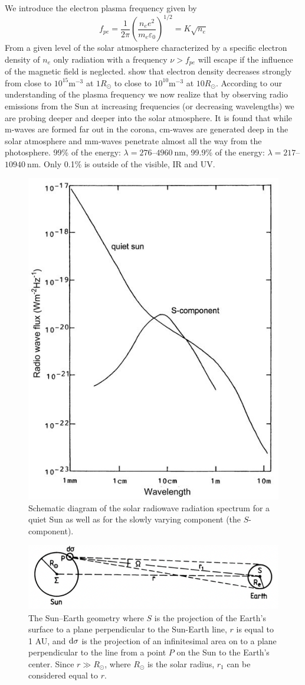We introduce the electron plasma frequency given by
\begin{equation*}
    f_{pe}=\frac{1}{2\pi}{\left(\frac{n_{e}e^2}{m_{e}\varepsilon_0}\right)}^{1/2}=K\sqrt{n_e}
\end{equation*}
From a given level of the solar atmosphere characterized by a specific electron density of \(n_e\) only radiation with a frequency \(\nu >f_{pe}\) will escape if the influence of the magnetic field is neglected.  show that electron density decreases strongly from close to \(10^{15} \si{\metre^{-3}}\) at \(1R_\odot \) to close to \(10^{10} \si{\metre^{-3}}\) at \(10R_\odot \). According to our understanding of the plasma frequency we now realize that by observing radio emissions from the Sun at increasing frequencies (or decreasing wavelengths) we are probing deeper and deeper into the solar atmosphere. It is found that while m-waves are formed far out in the corona, cm-waves are generated deep in the solar atmosphere and mm-waves penetrate almost all the way from the photosphere. 99\% of the energy: \(\lambda=276\)--\(\SI{4960}{\nano\metre}\), 99.9\% of the energy: \(\lambda=217\)--\(\SI{10940}{\nano\metre}\). Only 0.1\% is outside of the visible, IR and UV\@.
\begin{figure}[t]
    \centering
    \includegraphics[width=.4\linewidth]{bilder/L9_solar_radiowave_radiation_spectrum.jpg}
    \caption{Schematic diagram of the solar radiowave radiation spectrum for a quiet Sun as well as for the slowly varying component (the \(S\)-component).}\label{fig:L9_solar_radiowave_radiation_spectrum}
\end{figure}
\begin{figure}[t]
    \centering
    \includegraphics[width=.9\linewidth]{bilder/L9_sun_earth_geometry.png}
    \caption{The Sun–Earth geometry where \(S\) is the projection of the Earth's surface to a plane perpendicular to the Sun-Earth line, \(r\) is equal to 1 AU, and \(\textnormal{d}\sigma \) is the projection of an infinitesimal area on to a plane perpendicular to the line from a point \(P\) on the Sun to the Earth's center. Since \(r\gg R_\odot \), where \(R_\odot \) is the solar radius, \(r_1\) can be considered equal to \(r\).}\label{fig:L9_sun_earth_geometry}
\end{figure}
